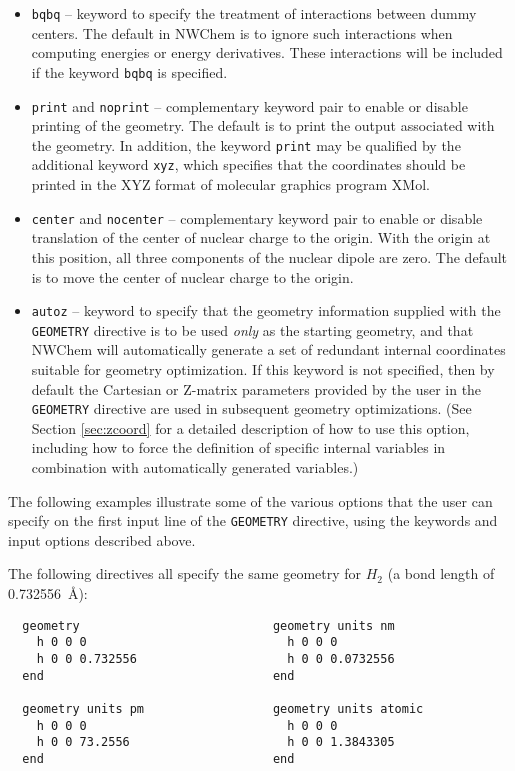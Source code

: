 \begin{itemize}
\item \verb+bqbq+ -- keyword to specify the treatment of interactions
  between dummy centers.  The default in NWChem is to ignore such
  interactions when computing energies or energy derivatives.  These
  interactions will be included if the keyword \verb+bqbq+ is
  specified.

\item \verb+print+ and \verb+noprint+ -- complementary keyword pair to
  enable or disable printing of the geometry.  The default is to print
  the output associated with the geometry.  In addition, the keyword
  \verb+print+ may be qualified by the additional keyword \verb+xyz+,
  which specifies that the coordinates should be printed in the XYZ
  format of molecular graphics program XMol.

\item \verb+center+ and \verb+nocenter+ -- complementary keyword pair
  to enable or disable translation of the center of nuclear charge to
  the origin.  With the origin at this position, all three components
  of the nuclear dipole are zero.  The default is to move the center
  of nuclear charge to the origin.

\item \verb+autoz+ -- keyword to specify that the geometry information
  supplied with the \verb+GEOMETRY+ directive is to be used {\em only}
  as the starting geometry, and that NWChem will automatically
  generate a set of redundant internal coordinates suitable for
  geometry optimization.  If this keyword is not specified, then by
  default the Cartesian or Z-matrix parameters provided by the user in
  the \verb+GEOMETRY+ directive are used in subsequent geometry
  optimizations.  (See Section \ref{sec:zcoord} for a detailed
  description of how to use this option, including how to force the
  definition of specific internal variables in combination with
  automatically generated variables.)
\end{itemize}

The following examples illustrate some of the various options that the
user can specify on the first input line of the \verb+GEOMETRY+
directive, using the keywords and input options described above.

The following directives all specify the same geometry for $H_2$ (a
bond length of 0.732556\ \AA):
\begin{verbatim}
  geometry                           geometry units nm    
    h 0 0 0                            h 0 0 0            
    h 0 0 0.732556                     h 0 0 0.0732556    
  end                                end                  

  geometry units pm                  geometry units atomic 
    h 0 0 0                            h 0 0 0             
    h 0 0 73.2556                      h 0 0 1.3843305     
  end                                end                   
\end{verbatim}
      

